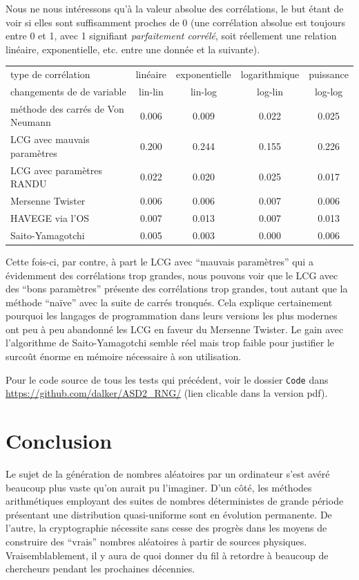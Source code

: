 \documentclass{scrartcl}
\begin{document}
Nous ne nous intéressons qu'à la valeur absolue des corrélations, le but étant
de voir si elles sont suffisamment proches de 0 (une corrélation absolue est
toujours entre 0 et 1, avec 1 signifiant \textit{parfaitement corrélé}, soit
réellement une relation linéaire, exponentielle, etc. entre une donnée et la
suivante).
\begin{center}
  \begin{tabular}{lcccc}
    type de corrélation & linéaire & exponentielle & logarithmique & puissance\\
    changements de de variable & lin-lin & lin-log & log-lin & log-log\\
    \hline
    méthode des carrés de Von Neumann&0.006&  0.009& 0.022&  0.025 \\
    LCG avec mauvais paramètres&  0.200&  0.244&  0.155&  0.226\\
    LCG avec paramètres RANDU&  0.022&  0.020&  0.025&  0.017\\
    Mersenne Twister& 0.006&  0.006&  0.007&  0.006\\
    HAVEGE via l'OS&  0.007&  0.013&  0.007&  0.013\\
    Saito-Yamagotchi& 0.005&  0.003&  0.000&  0.006
  \end{tabular}
\end{center}

Cette fois-ci, par contre, à part le LCG avec ``mauvais paramètres'' qui a
évidemment des corrélations trop grandes, nous pouvons voir que le LCG avec des
``bons paramètres'' présente des corrélations trop grandes, tout autant que la
méthode ``naïve'' avec la suite de carrés tronqués. Cela explique certainement
pourquoi les langages de programmation dans leurs versions les plus modernes
ont peu à peu abandonné les LCG en faveur du Mersenne Twister. Le gain avec
l'algorithme de Saito-Yamagotchi semble réel mais trop faible pour justifier le
surcoût énorme en mémoire nécessaire à son utilisation. 

Pour le code source de tous les tests qui précédent, voir le dossier
\texttt{Code} dans \url{https://github.com/dalker/ASD2_RNG/} (lien clicable dans
la version pdf).

\section{Conclusion}
Le sujet de la génération de nombres aléatoires par un ordinateur s'est avéré
beaucoup plus vaste qu'on aurait pu l'imaginer. D'un côté, les méthodes
arithmétiques employant des suites de nombres déterministes de grande période
présentant une distribution quasi-uniforme sont en évolution permanente. De
l'autre, la cryptographie nécessite sans cesse des progrès dans les moyens de
construire des ``vrais'' nombres aléatoires à partir de sources
physiques. Vraisemblablement, il y aura de quoi donner du fil à retordre à
beaucoup de chercheurs pendant les prochaines décennies.

\printbibliography
\end{document}
